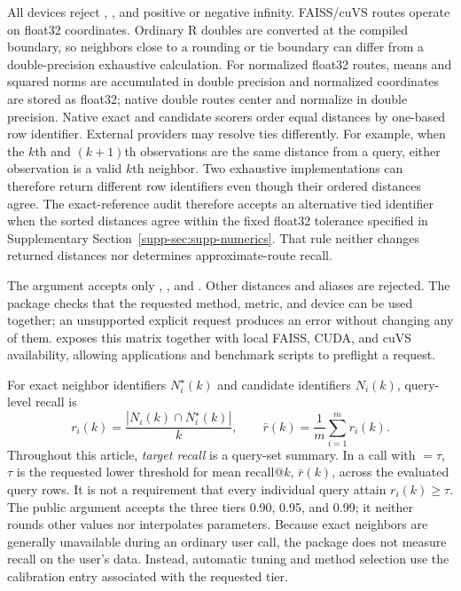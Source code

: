 \documentclass[article]{jss}
\begin{document}
All devices reject , , and positive or negative infinity.
FAISS/cuVS routes operate on float32 coordinates. Ordinary R doubles are
converted at the compiled boundary, so neighbors close to a rounding or tie
boundary can differ from a double-precision exhaustive calculation. For
normalized float32 routes, means and squared norms are accumulated in double
precision and normalized coordinates are stored as float32; native double
routes center and normalize in double precision. Native exact and candidate
scorers order equal distances by one-based row identifier. External providers
may resolve ties differently. For example, when the $k$th and $(k+1)$th
observations are the same distance from a query, either observation is a valid
$k$th neighbor. Two exhaustive implementations can therefore return different
row identifiers even though their ordered distances agree. The exact-reference
audit therefore accepts an alternative tied identifier when the sorted
distances agree within the fixed float32 tolerance specified in Supplementary
Section~\ref{supp-sec:supp-numerics}. That rule neither changes returned
distances nor determines approximate-route recall.

The  argument accepts only , ,
and . Other distances and aliases are rejected.
The package checks that the requested method, metric, and device can be used
together; an unsupported explicit request produces an error without changing
any of them.
 exposes this matrix together with local
FAISS, CUDA, and cuVS availability, allowing applications and benchmark scripts
to preflight a request.

For exact neighbor identifiers $N_i^{\star}(k)$ and candidate identifiers
$N_i(k)$, query-level recall is
\begin{equation}
r_i(k)=\frac{|N_i(k)\cap N_i^{\star}(k)|}{k},
\qquad
\bar r(k)=\frac{1}{m}\sum_{i=1}^{m}r_i(k).
\label{eq:recall}
\end{equation}
Throughout this article, \emph{target recall} is a query-set summary. In a
call with  $= \tau$, $\tau$ is the requested lower
threshold for mean recall@$k$, $\bar r(k)$, across the evaluated query rows.
It is not a requirement that every individual query attain $r_i(k)\geq\tau$.
The public argument accepts the three tiers 0.90, 0.95, and 0.99; it neither
rounds other values nor interpolates parameters. Because exact neighbors are
generally unavailable during an ordinary user call, the package does not
measure recall on the user's data. Instead, automatic tuning and method
selection use the calibration entry associated with the requested tier.
\end{document}
